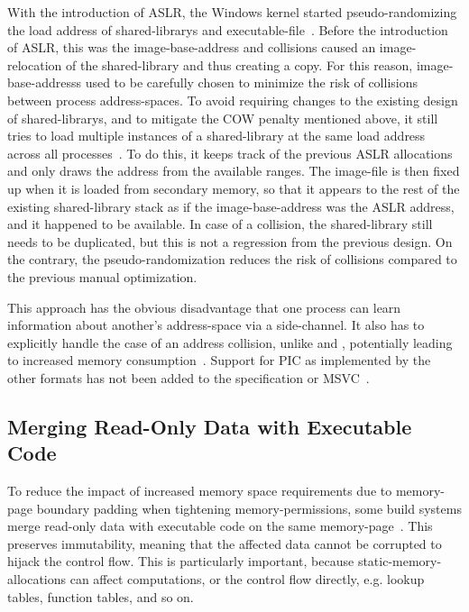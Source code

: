 With the introduction of \gls{ASLR}, the Windows kernel started pseudo-randomizing the load address of \glspl{shared-library} and \gls{executable-file}~\cite{ms-aslr}. Before the introduction of \gls{ASLR}, this was the \gls{image-base-address} and collisions caused an \gls{image-relocation} of the \gls{shared-library} and thus creating a copy. For this reason, \glspl{image-base-address} used to be carefully chosen to minimize the risk of collisions between process \glspl{address-space}. To avoid requiring changes to the existing design of \glspl{shared-library}, and to mitigate the \gls{COW} penalty mentioned above, it still tries to load multiple instances of a \gls{shared-library} at the same load address across all processes~\cite{ms-dll-base-addr}. To do this, it keeps track of the previous \gls{ASLR} allocations and only draws the address from the available ranges. The \gls{image-file} is then fixed up when it is loaded from secondary memory, so that it appears to the rest of the existing \gls{shared-library} stack as if the \gls{image-base-address} was the \gls{ASLR} address, and it happened to be available. In case of a collision, the \gls{shared-library} still needs to be duplicated, but this is not a regression from the previous design. On the contrary, the \gls{pseudo-randomization} reduces the risk of collisions compared to the previous manual optimization.

This approach has the obvious disadvantage that one process can learn information about another's \gls{address-space} via a \gls{side-channel}. It also has to explicitly handle the case of an address collision, unlike  and , potentially leading to increased memory consumption~\cite{ms-dll-base-addr}. Support for \gls{PIC} as implemented by the other formats has not been added to the  specification or \gls{MSVC}~\cite{pe-format}.

\subsection{Merging Read-Only Data with Executable Code}
\label{sec:merge_ro_x}

To reduce the impact of increased memory space requirements due to \gls{memory-page} boundary padding when tightening \gls{memory-permissions}, some build systems merge read-only data with executable code on the same \gls{memory-page}~\cite{macho-spec,edk2}. This preserves immutability, meaning that the affected data cannot be corrupted to hijack the control flow. This is particularly important, because \glspl{static-memory-allocation} can affect computations, or the control flow directly, e.g. lookup tables, function tables, and so on.

